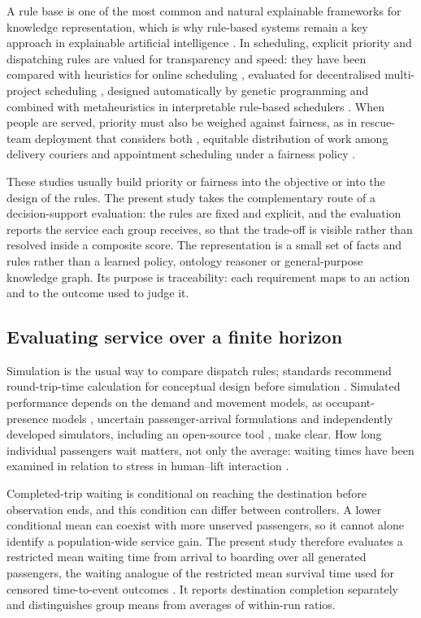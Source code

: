 A rule base is one of the most common and natural explainable frameworks for knowledge representation, which is why rule-based systems remain a key approach in explainable artificial intelligence \cite{yang2022}. In scheduling, explicit priority and dispatching rules are valued for transparency and speed: they have been compared with heuristics for online scheduling \cite{xiong2024}, evaluated for decentralised multi-project scheduling \cite{mao2024}, designed automatically by genetic programming \cite{luo2022} and combined with metaheuristics in interpretable rule-based schedulers \cite{barut2024}. When people are served, priority must also be weighed against fairness, as in rescue-team deployment that considers both \cite{tang2026}, equitable distribution of work among delivery couriers \cite{martinez2024} and appointment scheduling under a fairness policy \cite{ala2022}.

These studies usually build priority or fairness into the objective or into the design of the rules. The present study takes the complementary route of a decision-support evaluation: the rules are fixed and explicit, and the evaluation reports the service each group receives, so that the trade-off is visible rather than resolved inside a composite score. The representation is a small set of facts and rules rather than a learned policy, ontology reasoner or general-purpose knowledge graph. Its purpose is traceability: each requirement maps to an action and to the outcome used to judge it.

\subsection{Evaluating service over a finite horizon}\label{observation-horizons-and-the-research-question}

Simulation is the usual way to compare dispatch rules; standards recommend round-trip-time calculation for conceptual design before simulation \cite{so2022,siikonen2026}. Simulated performance depends on the demand and movement models, as occupant-presence models \cite{ref14}, uncertain passenger-arrival formulations \cite{ref27} and independently developed simulators, including an open-source tool \cite{ref22,ref23,ref29,tartan2024}, make clear. How long individual passengers wait matters, not only the average: waiting times have been examined in relation to stress in human--lift interaction \cite{shiomi2025}.

Completed-trip waiting is conditional on reaching the destination before observation ends, and this condition can differ between controllers. A lower conditional mean can coexist with more unserved passengers, so it cannot alone identify a population-wide service gain. The present study therefore evaluates a restricted mean waiting time from arrival to boarding over all generated passengers, the waiting analogue of the restricted mean survival time used for censored time-to-event outcomes \cite{refRMST}. It reports destination completion separately and distinguishes group means from averages of within-run ratios.

